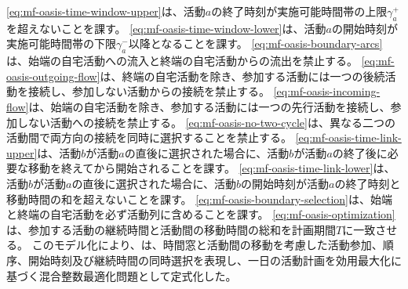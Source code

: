 \eqref{eq:mf-oasis-time-window-upper}は、活動$a$の終了時刻が実施可能時間帯の上限$\gamma_a^{+}$を超えないことを課す。
\eqref{eq:mf-oasis-time-window-lower}は、活動$a$の開始時刻が実施可能時間帯の下限$\gamma_a^{-}$以降となることを課す。
\eqref{eq:mf-oasis-boundary-arcs}は、始端の自宅活動への流入と終端の自宅活動からの流出を禁止する。
\eqref{eq:mf-oasis-outgoing-flow}は、終端の自宅活動を除き、参加する活動には一つの後続活動を接続し、参加しない活動からの接続を禁止する。
\eqref{eq:mf-oasis-incoming-flow}は、始端の自宅活動を除き、参加する活動には一つの先行活動を接続し、参加しない活動への接続を禁止する。
\eqref{eq:mf-oasis-no-two-cycle}は、異なる二つの活動間で両方向の接続を同時に選択することを禁止する。
\eqref{eq:mf-oasis-time-link-upper}は、活動$b$が活動$a$の直後に選択された場合に、活動$b$が活動$a$の終了後に必要な移動を終えてから開始されることを課す。
\eqref{eq:mf-oasis-time-link-lower}は、活動$b$が活動$a$の直後に選択された場合に、活動$b$の開始時刻が活動$a$の終了時刻と移動時間の和を超えないことを課す。
\eqref{eq:mf-oasis-boundary-selection}は、始端と終端の自宅活動を必ず活動列に含めることを課す。
\eqref{eq:mf-oasis-optimization}は、参加する活動の継続時間と活動間の移動時間の総和を計画期間$T$に一致させる。
このモデル化により、\citet{pougala2023oasis}は、時間窓と活動間の移動を考慮した活動参加、順序、開始時刻及び継続時間の同時選択を表現し、一日の活動計画を効用最大化に基づく混合整数最適化問題として定式化した。


